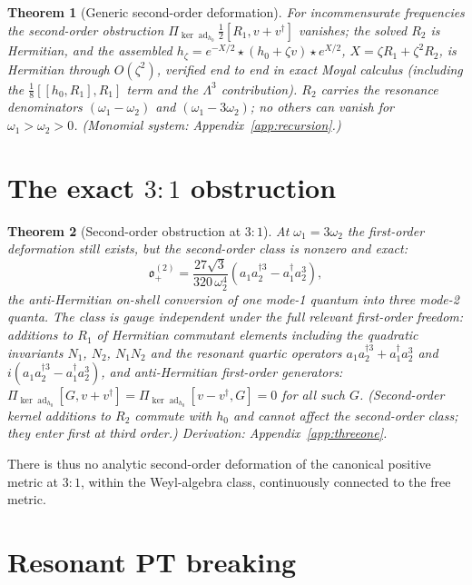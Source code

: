 \documentclass[11pt]{article}
\newtheorem{theorem}{Theorem}[section]
\theoremstyle{definition}
\theoremstyle{remark}
\newcommand{\w}{\omega}
\newcommand{\dg}{\dagger}
\newcommand{\ad}{\operatorname{ad}}
\newcommand{\ob}{\mathfrak o}
\newcommand{\kerad}{\Pi_{\ker\ad_{h_0}}}
\begin{document}
\begin{theorem}[Generic second-order deformation]\label{thm:secondgen}
For incommensurate frequencies the second-order obstruction
$\kerad\tfrac12[R_1,v+v^{\dg}]$ vanishes; the solved $R_2$ is
Hermitian, and the assembled
$h_\zeta=e^{-X/2}\star(h_0+\zeta v)\star e^{X/2}$,
$X=\zeta R_1+\zeta^2R_2$, is Hermitian through $O(\zeta^2)$, verified
end to end in exact Moyal calculus (including the
$\tfrac18[[h_0,R_1],R_1]$ term and the $\Lambda^3$ contribution).
$R_2$ carries the resonance denominators $(\w_1-\w_2)$ and
$(\w_1-3\w_2)$; no others can vanish for $\w_1>\w_2>0$.  (Monomial
system: Appendix~\ref{app:recursion}.)
\end{theorem}

\section{The exact $3{:}1$ obstruction}\label{sec:threeone}

\begin{theorem}[Second-order obstruction at $3{:}1$]\label{thm:threeone}
At $\w_1=3\w_2$ the first-order deformation still exists, but the
second-order class is nonzero and exact:
\begin{equation}
\ob_+^{(2)}
=\frac{27\sqrt3}{320\,\w_2^4}
\left(a_1a_2^{\dg3}-a_1^{\dg}a_2^3\right),
\end{equation}
the anti-Hermitian on-shell conversion of one mode-1 quantum into three
mode-2 quanta.  The class is gauge independent under the full relevant
first-order freedom: additions to $R_1$ of Hermitian commutant elements
including the quadratic invariants $N_1$, $N_2$, $N_1N_2$ \emph{and the
resonant quartic operators} $a_1a_2^{\dg3}+a_1^{\dg}a_2^3$ and
$i(a_1a_2^{\dg3}-a_1^{\dg}a_2^3)$, and anti-Hermitian first-order
generators:
$\kerad[G,v+v^{\dg}]=\kerad[v-v^{\dg},G]=0$ for all such $G$.
(Second-order kernel additions to $R_2$ commute with $h_0$ and cannot
affect the second-order class; they enter first at third order.)
Derivation: Appendix~\ref{app:threeone}.
\end{theorem}

There is thus no analytic second-order deformation of the canonical
positive metric at $3{:}1$, within the Weyl-algebra class, continuously
connected to the free metric.

\section{Resonant PT breaking}\label{sec:spectral}
\end{document}
